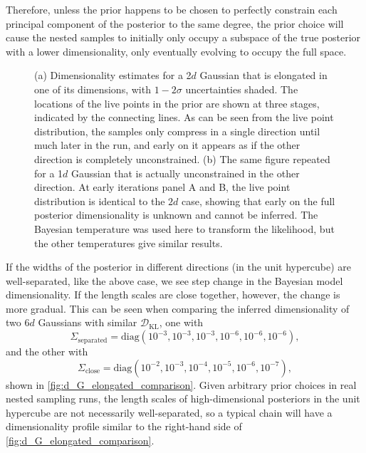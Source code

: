 \documentclass[usenatbib]{mnras}
\newcommand{\DKL}{\mathcal{D}_\mathrm{KL}}
\begin{document}
\par
Therefore, unless the prior happens to be chosen to perfectly constrain each principal component of the posterior to the same degree, the prior choice will cause the nested samples to initially only occupy a subspace of the true posterior with a lower dimensionality, only eventually evolving to occupy the full space.
\begin{figure}
\begin{center}
\end{center}
\caption{(a) Dimensionality estimates for a 2$d$ Gaussian that is elongated in one of its dimensions, with $1-2\sigma$ uncertainties shaded. The locations of the live points in the prior are shown at three stages, indicated by the connecting lines. As can be seen from the live point distribution, the samples only compress in a single direction until much later in the run, and early on it appears as if the other direction is completely unconstrained. (b) The same figure repeated for a 1$d$ Gaussian that is actually unconstrained in the other direction. At early iterations panel A and B, the live point distribution is identical to the $2d$ case, showing that early on the full posterior dimensionality is unknown and cannot be inferred. The Bayesian temperature was used here to transform the likelihood, but the other temperatures give similar results.}
\label{fig:d_G_elongated}
\end{figure}
\par
If the widths of the posterior in different directions (in the unit hypercube) are well-separated, like the above case, we see step change in the Bayesian model dimensionality. If the length scales are close together, however, the change is more gradual. This can be seen when comparing the inferred dimensionality of two $6d$ Gaussians with similar $\DKL$, one with 
\begin{equation}\label{eq:elongated_separated}
    \Sigma_\mathrm{separated} = \mathrm{diag}(10^{-3}, 10^{-3}, 10^{-3}, 10^{-6}, 10^{-6}, 10^{-6}),
\end{equation}
and the other with 
\begin{equation}\label{eq:elongated_close}
    \Sigma_\mathrm{close} = \mathrm{diag}(10^{-2}, 10^{-3}, 10^{-4}, 10^{-5}, 10^{-6}, 10^{-7}),
\end{equation}
shown in \cref{fig:d_G_elongated_comparison}. Given arbitrary prior choices in real nested sampling runs, the length scales of high-dimensional posteriors in the unit hypercube are not necessarily well-separated, so a typical chain will have a dimensionality profile similar to the right-hand side of \cref{fig:d_G_elongated_comparison}.
\end{document}
